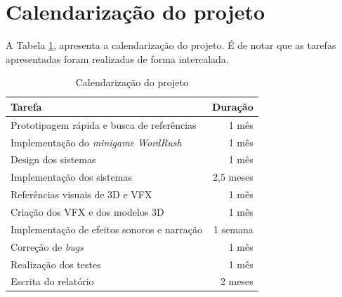 \section{Calendarização do projeto}

A Tabela \ref{tab:Calendario}, apresenta a calendarização do projeto. É de notar que as tarefas apresentadas foram realizadas de forma intercalada.

\begin{table}[H]
\begin{tabular}{|l|r|}
\textbf{Tarefa} & \textbf{Duração} \\ \hline
Prototipagem rápida e busca de referências & 1 mês \\ \hline
Implementação do \textit{minigame WordRush} & 1 mês \\ \hline
Design dos sistemas & 1 mês \\ \hline
Implementação dos sistemas & 2,5 meses \\ \hline
Referências visuais de 3D e \ac{VFX} & 1 mês \\ \hline
Criação dos \ac{VFX} e dos modelos 3D & 1 mês \\ \hline
Implementação de efeitos sonoros e narração & 1 semana \\ \hline
Correção de \textit{bugs} & 1 mês \\ \hline
Realização dos testes & 1 mês \\ \hline
Escrita do relatório & 2 meses \\ \hline
\end{tabular}
\centering
\caption{Calendarização do projeto}
\label{tab:Calendario}
\end{table}